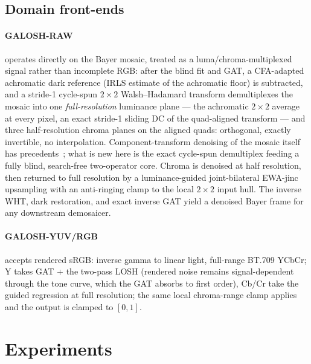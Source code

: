 \documentclass[journal]{IEEEtran}
\begin{document}
\subsection{Domain front-ends}
\paragraph{GALOSH-RAW} operates directly on the Bayer mosaic, treated as a
luma/chroma-multiplexed signal rather than incomplete RGB: after the blind
fit and GAT, a CFA-adapted achromatic dark reference (IRLS estimate of the
achromatic floor) is subtracted, and a stride-1 cycle-spun $2{\times}2$
Walsh--Hadamard transform demultiplexes the mosaic into one
\emph{full-resolution} luminance plane --- the achromatic $2{\times}2$
average at every pixel, an exact stride-1 sliding DC of the quad-aligned
transform --- and three half-resolution chroma planes on the aligned
quads: orthogonal, exactly invertible, no interpolation. Component-transform
denoising of the mosaic itself has precedents~\cite{hirakawa,park09}; what is
new here is the exact cycle-spun demultiplex feeding a fully blind,
search-free two-operator core. Chroma is denoised at
half resolution, then returned to full resolution by a luminance-guided
joint-bilateral EWA-jinc upsampling with an anti-ringing clamp to the local
$2{\times}2$ input hull. The inverse WHT, dark restoration, and exact inverse
GAT yield a denoised Bayer frame for any downstream demosaicer.

\paragraph{GALOSH-YUV/RGB} accepts rendered sRGB: inverse gamma to linear
light, full-range BT.709 YCbCr; Y takes GAT + the two-pass LOSH (rendered
noise remains signal-dependent through the tone curve, which the GAT absorbs
to first order), Cb/Cr take the guided regression at full resolution; the same
local chroma-range clamp applies and the output is clamped to $[0,1]$.

\section{Experiments}
\end{document}
